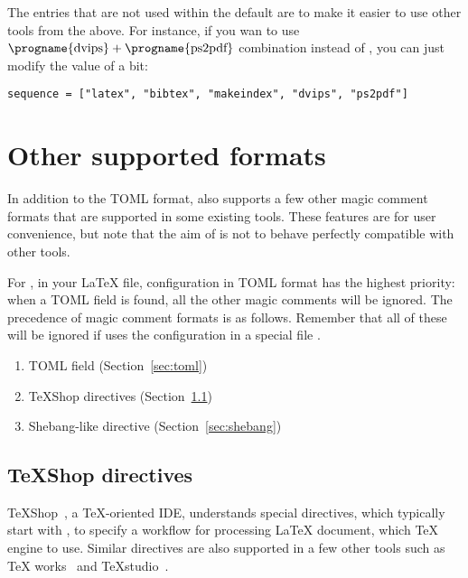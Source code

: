 \documentclass[draft]{llmk-doc}
\begin{document}
The entries that are not used within the default  are to make it
easier to use other tools from the above. For instance, if you wan to use
$\text{\progname{dvips}}+\text{\progname{ps2pdf}}$ combination instead of
, you can just modify the value of  a bit:
%
\begin{lstlisting}[style=toml]
sequence = ["latex", "bibtex", "makeindex", "dvips", "ps2pdf"]
\end{lstlisting}

\section{Other supported formats}
\label{sec:magic-comment}

In addition to the TOML format,  also supports a few other magic
comment formats that are supported in some existing tools. These features are
for user convenience, but note that the aim of  is not to behave
perfectly compatible with other tools.

For , in your {\LaTeX} file, configuration in TOML format has the
highest priority: when a TOML field is found, all the other magic comments will
be ignored. The precedence of magic comment formats is as follows. Remember
that all of these will be ignored if  uses the configuration in a
special file .
%
\begin{enumerate}
\item TOML field (Section~\ref{sec:toml})
\item {\TeX}Shop directives (Section~\ref{sec:ts-directive})
\item Shebang-like directive (Section~\ref{sec:shebang})
\end{enumerate}

\subsection{{\TeX}Shop directives}
\label{sec:ts-directive}

{\TeX}Shop~\cite{texshop}, a {\TeX}-oriented IDE, understands special
directives, which typically start with , to
specify a workflow for processing {\LaTeX} document, \eg which {\TeX} engine to
use. Similar directives are also supported in a few other tools such as {\TeX}%
works~\cite{texworks} and {\TeX}studio~\cite{texstudio}.
\end{document}
